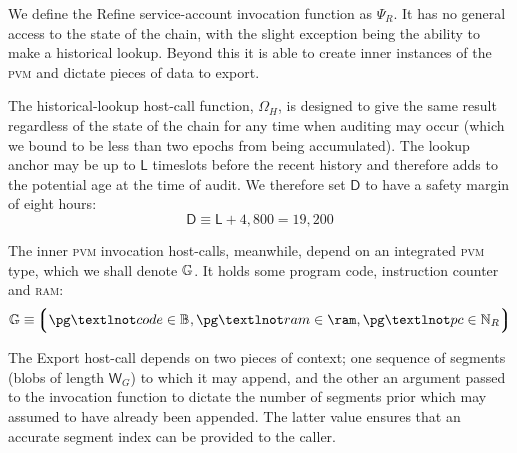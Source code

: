 We define the Refine service-account invocation function as $\Psi_R$. It has no general access to the state of the \Jam chain, with the slight exception being the ability to make a historical lookup. Beyond this it is able to create inner instances of the \textsc{pvm} and dictate pieces of data to export.

The historical-lookup host-call function, $\Omega_H$, is designed to give the same result regardless of the state of the chain for any time when auditing may occur (which we bound to be less than two epochs from being accumulated). The lookup anchor may be up to $\mathsf{L}$ timeslots before the recent history and therefore adds to the potential age at the time of audit. We therefore set $\mathsf{D}$ to have a safety margin of eight hours:
\begin{equation}
  \mathsf{D} \equiv \mathsf{L} + 4,800 = 19,200
\end{equation}


The inner \textsc{pvm} invocation host-calls, meanwhile, depend on an integrated \textsc{pvm} type, which we shall denote $\mathbb{G}$. It holds some program code, instruction counter and \textsc{ram}:
\begin{equation}\label{eq:pvmguest}
  \pvmguest \equiv \tuple{\isa{\pg¬code}{\blob}, \isa{\pg¬ram}{\ram}, \isa{\pg¬pc}{\pvmreg}}
\end{equation}

The Export host-call depends on two pieces of context; one sequence of segments (blobs of length $\mathsf{W}_G$) to which it may append, and the other an argument passed to the invocation function to dictate the number of segments prior which may assumed to have already been appended. The latter value ensures that an accurate segment index can be provided to the caller.

